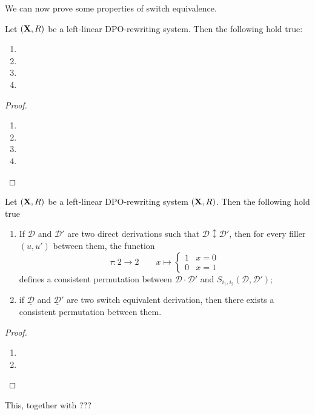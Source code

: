 \documentclass[a4paper,UKenglish,cleveref,pdftex, thm-restate,numberwithinsect]{lipics}
\def\R{\mathsf{R}}
\def\X{\textbf {\textup{X}}}
\newcommand{\dder}[1]{\mathscr{#1}}
\newcommand{\sder}[2]{S_{i_1,i_2}(\mathscr{#1}, \mathscr{#2})}
\newcommand{\der}[1]{\underline{\dder{#1}}}
\begin{document}
We can now prove some properties of switch equivalence.
\begin{lemma}Let $(\X, \R)$ be a left-linear DPO-rewriting system. Then the following hold true: 
	\begin{enumerate}
		\item 
		\item 
		\item 
		\item 
	\end{enumerate}
\end{lemma}
\begin{proof}\begin{enumerate}
		\item 
		\item 
		\item 
		\item \qedhere 
	\end{enumerate}
\end{proof}


\begin{example}
\end{example}



\begin{lemma}\label{lem:consperm} Let $(\X, \R)$ be a left-linear DPO-rewriting system $(\X, \R)$. Then the following hold true
	\begin{enumerate}
		\item If $\dder{D}$ and $\dder{D'}$ are two direct derivations such that $\dder{D}\updownarrow \dder{D'}$, then for every filler $(u,u')$ between them, the function
		\[\tau\colon 2\to2 \qquad x \mapsto \begin{cases}
			1 & x=0\\
			0 & x=1
		\end{cases}\]
		defines a consistent permutation between $\dder{D}\cdot \dder{D}'$ and $\sder{D}{D'}$;
		\item if $\der{D}$ and $\der{D}'$ are two switch equivalent derivation, then there exists a consistent permutation between them.
	\end{enumerate}
\end{lemma}
\begin{proof}
	\begin{enumerate}
		\item 
		\item \qedhere 
	\end{enumerate}
\end{proof}
 This, together with ???
\begin{corollary}
\end{corollary}
\end{document}
